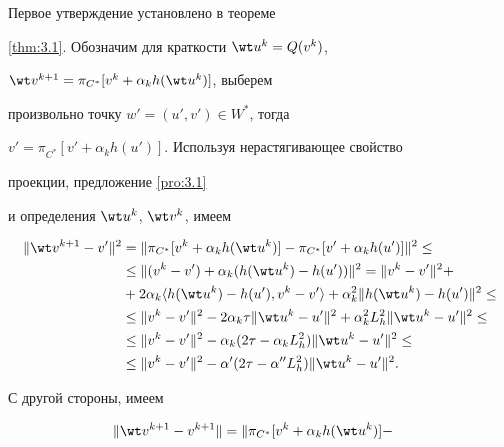 \begin{pf}


Первое утверждение установлено в теореме 


\ref{thm:3.1}. Обозначим для краткости $\wt u^{k}=Q(v^{k})$, 


$\wt v^{k+1}=\pi_{C^*} [v^{k}+\alpha_{k} h(\wt u^{k})] $, выберем 


произвольно точку $w'=(u', v') \in W^*$, тогда 


$v'=\pi_{C^*}[v'+\alpha_{k} h(u')]$. Используя нерастягивающее свойство 


проекции, предложение \ref{pro:3.1}


и определения $\wt u^{k}$, $\wt v^{k}$, имеем 


\begin{align*}


\| \wt v^{k+1} - v' \|^2 &=\|\pi_{C^*} [v^{k}+\alpha_{k} h(\wt u^{k})] -


\pi_{C^*} [v'+\alpha_{k} h(u')] \|^2\le \\


%


& \leq \|(v^{k}-v')+\alpha_{k} (h(\wt u^{k})-h(u'))\|^2=\| v^{k} - v' \|^2+\\


%


&+ 2 \alpha_{k} \langle h(\wt u^{k}) - h(u'), v^{k} - v' \rangle+


\alpha_{k}^2 \| h(\wt u^{k}) - h(u') \|^2\le \\ 


%


&\leq \| v^{k} - v' \|^2 - 2 \alpha_{k} \tau \| \wt u^{k} - u' \|^2+


\alpha_{k}^2 L_{h}^2 \| \wt u^{k} - u' \|^2\le \\ 


%


&\leq\|v^{k}-v'\|^2-\alpha_k(2\tau-\alpha_k L_{h}^2)\|\wt u^k-u' \|^2\le \\ 


%


&\leq \|v^{k}-v'\|^2-\alpha'(2\tau-\alpha'' L_{h}^2)\|\wt u^{k} - u' \|^2. 


\end{align*}


С другой стороны, имеем


\begin{align*}


\| \wt v^{k+1} - v^{k+1} \| &=\|\pi_{C^*} [v^{k}+\alpha_{k} h(\wt u^{k})] -



\end{align*}
\end{pf}
